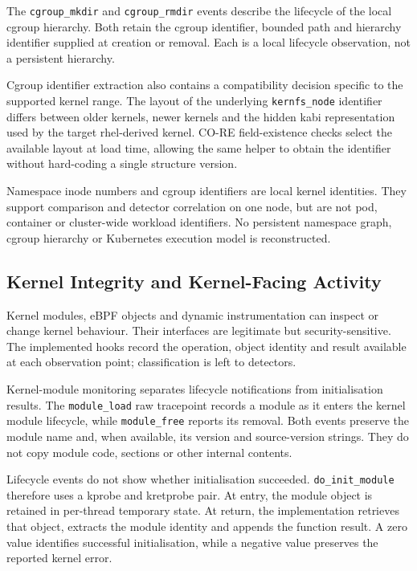 The \texttt{cgroup\_mkdir} and \texttt{cgroup\_rmdir} events describe the
lifecycle of the local cgroup hierarchy. Both retain the cgroup identifier,
bounded path and hierarchy identifier supplied at creation or removal. Each is
a local lifecycle observation, not a persistent hierarchy.

Cgroup identifier extraction also contains a compatibility decision specific
to the supported kernel range. The layout of the underlying
\texttt{kernfs\_node} identifier differs between older kernels, newer kernels
and the hidden \gls{kabi} representation used by the target \gls{rhel}-derived kernel.
CO-RE field-existence checks select the available layout at load time, allowing
the same helper to obtain the identifier without hard-coding a single
structure version.

Namespace inode numbers and cgroup identifiers are local kernel identities.
They support comparison and detector correlation on one node, but are not pod,
container or cluster-wide workload identifiers. No persistent namespace graph,
cgroup hierarchy or Kubernetes execution model is reconstructed.

\subsection{Kernel Integrity and Kernel-Facing Activity}
\label{subsec:implementation-kernel-activity-hooks}

Kernel modules, eBPF objects and dynamic instrumentation can inspect or change
kernel behaviour. Their interfaces are legitimate but security-sensitive. The
implemented hooks record the operation, object identity and result available at
each observation point; classification is left to detectors.

Kernel-module monitoring separates lifecycle notifications from initialisation
results. The \texttt{module\_load} raw tracepoint records a
module as it enters the kernel module lifecycle, while
\texttt{module\_free} reports its removal. Both events preserve the module
name and, when available, its version and source-version strings. They do not
copy module code, sections or other internal contents.

Lifecycle events do not show whether initialisation succeeded.
\texttt{do\_init\_module} therefore uses a kprobe and kretprobe pair. At entry,
the module object is
retained in per-thread temporary state. At return, the implementation retrieves
that object, extracts the module identity and appends the function result. A
zero value identifies successful initialisation, while a negative value
preserves the reported kernel error.

